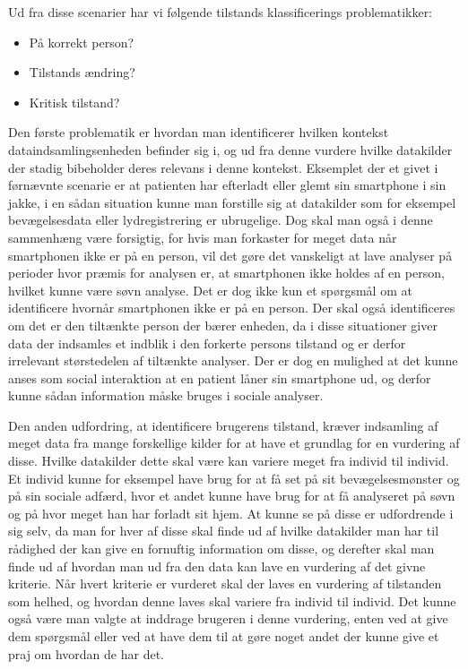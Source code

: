 Ud fra disse scenarier har vi følgende tilstands klassificerings problematikker:
\begin{itemize}
\item På korrekt person?
\item Tilstands ændring?
\item Kritisk tilstand?
\end{itemize}

Den første problematik er hvordan man identificerer hvilken kontekst dataindsamlingsenheden befinder sig i, og ud fra denne vurdere hvilke datakilder der stadig bibeholder deres relevans i denne kontekst.
Eksemplet der et givet i førnævnte scenarie er at patienten har efterladt eller glemt sin smartphone i sin jakke, i en sådan situation kunne man forstille sig at datakilder som for eksempel bevægelsesdata eller lydregistrering er ubrugelige.
Dog skal man også i denne sammenhæng være forsigtig, for hvis man forkaster for meget data når smartphonen ikke er på en person, vil det gøre det vanskeligt at lave analyser på perioder hvor præmis for analysen er, at smartphonen ikke holdes af en person, hvilket kunne være søvn analyse. 
Det er dog ikke kun et spørgsmål om at identificere hvornår smartphonen ikke er på en person.
Der skal også identificeres om det er den tiltænkte person der bærer enheden, da i disse situationer giver data der indsamles et indblik i den forkerte persons tilstand og er derfor irrelevant størstedelen af tiltænkte analyser.
Der er dog en mulighed at det kunne anses som social interaktion at en patient låner sin smartphone ud, og derfor kunne sådan information måske bruges i sociale analyser.

Den anden udfordring, at identificere brugerens tilstand, kræver indsamling af meget data fra mange forskellige kilder for at have et grundlag for en vurdering af disse.
Hvilke datakilder dette skal være kan variere meget fra individ til individ.
Et individ kunne for eksempel have brug for at få set på sit bevægelsesmønster og på sin sociale adfærd, hvor et andet kunne have brug for at få analyseret på søvn og på hvor meget han har forladt sit hjem.
At kunne se på disse er udfordrende i sig selv, da man for hver af disse skal finde ud af hvilke datakilder man har til rådighed der kan give en fornuftig information om disse, og derefter skal man finde ud af hvordan man ud fra den data kan lave en vurdering af det givne kriterie.
Når hvert kriterie er vurderet skal der laves en vurdering af tilstanden som helhed, og hvordan denne laves skal variere fra individ til individ.
Det kunne også være man valgte at inddrage brugeren i denne vurdering, enten ved at give dem spørgsmål eller ved at have dem til at gøre noget andet der kunne give et praj om hvordan de har det.

